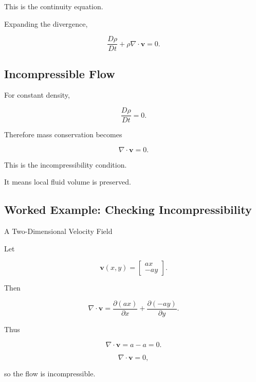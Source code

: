 This is the continuity equation.

Expanding the divergence,

\[
\boxed{
\frac{D\rho}{Dt}
+
\rho\nabla\cdot\mathbf{v}
=
0.
}
\]

\subsection{Incompressible Flow}
\label{subsec:incompressible-flow}

For constant density,

\[
\frac{D\rho}{Dt}=0.
\]

Therefore mass conservation becomes

\[
\boxed{
\nabla\cdot\mathbf{v}
=
0.
}
\]

This is the incompressibility condition.

It means local fluid volume is preserved.

\subsection{Worked Example: Checking Incompressibility}
\label{subsec:worked-checking-incompressibility}

\begin{workedexamplebox}{A Two-Dimensional Velocity Field}

Let

\[
\mathbf{v}(x,y)
=
\begin{bmatrix}
ax\\
-ay
\end{bmatrix}.
\]

Then

\[
\nabla\cdot\mathbf{v}
=
\frac{\partial(ax)}{\partial x}
+
\frac{\partial(-ay)}{\partial y}.
\]

Thus

\[
\nabla\cdot\mathbf{v}
=
a-a
=
0.
\]

\begin{answerbox}
\[
\boxed{
\nabla\cdot\mathbf{v}=0,
}
\]

so the flow is incompressible.
\end{answerbox}

\end{workedexamplebox}

